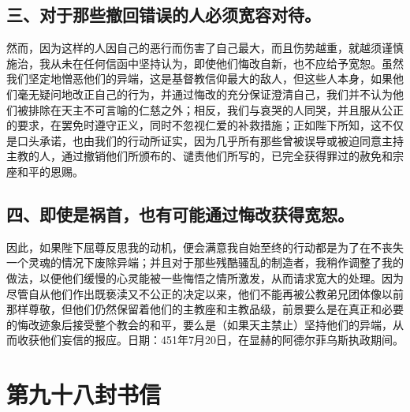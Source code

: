 \subsection{三、对于那些撤回错误的人必须宽容对待。}

然而，因为这样的人因自己的恶行而伤害了自己最大，而且伤势越重，就越须谨慎施治，我从未在任何信函中坚持认为，即使他们悔改自新，也不应给予宽恕。虽然我们坚定地憎恶他们的异端，这是基督教信仰最大的敌人，但这些人本身，如果他们毫无疑问地改正自己的行为，并通过悔改的充分保证澄清自己，我们并不认为他们被排除在天主不可言喻的仁慈之外；相反，我们与哀哭的人同哭，并且服从公正的要求，在罢免时遵守正义，同时不忽视仁爱的补救措施；正如陛下所知，这不仅是口头承诺，也由我们的行动所证实，因为几乎所有那些曾被误导或被迫同意主持主教的人，通过撤销他们所颁布的、谴责他们所写的，已完全获得罪过的赦免和宗座和平的恩赐。\par


\subsection{四、即使是祸首，也有可能通过悔改获得宽恕。}

因此，如果陛下屈尊反思我的动机，便会满意我自始至终的行动都是为了在不丧失一个灵魂的情况下废除异端；并且对于那些残酷骚乱的制造者，我稍作调整了我的做法，以便他们缓慢的心灵能被一些悔悟之情所激发，从而请求宽大的处理。因为尽管自从他们作出既亵渎又不公正的决定以来，他们不能再被公教弟兄团体像以前那样尊敬，但他们仍然保留着他们的主教座和主教品级，前景要么是在真正和必要的悔改迹象后接受整个教会的和平，要么是（如果天主禁止）坚持他们的异端，从而收获他们妄信的报应。日期：451年7月20日，在显赫的阿德尔菲乌斯执政期间。\par



\section{第九十八封书信}

\par

